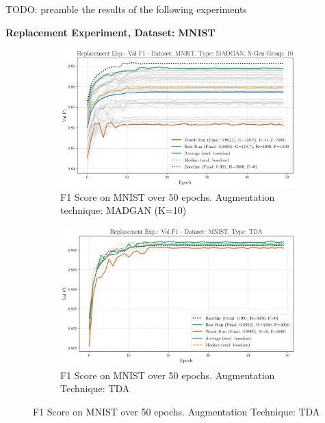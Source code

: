 TODO: preamble the results of the following experiments

\newpage
 \noindent\textbf{Replacement Experiment, Dataset: MNIST}
\begin{figure}[H]
	\centering
	\begin{subfigure}{.85\textwidth}
		\includegraphics[width=\textwidth]{abb/strat_classifier_performance/MNIST_STRATIFIED_CLASSIFIERS_MADGAN_NEW/replacement_experiments/val_f1_score_MADGAN_MNIST_n_gen_10_all.png}
		\caption{F1 Score on MNIST over 50 epochs. Augmentation technique: MADGAN (K=10)}
        \label{fig:res_replacement_mnist_tda_vs_madgan__madgan}
	\end{subfigure}
	\begin{subfigure}{.85\textwidth}
		\includegraphics[width=\textwidth]{abb/strat_classifier_performance/tda_mnist/replacement_experiments/val_f1_score_tda_mnist_mnist_all.png}
		\caption{F1 Score on MNIST over 50 epochs. Augmentation Technique: TDA}
        \label{fig:res_replacement_mnist_tda_vs_madgan__tda}
	\end{subfigure}
\end{figure}


